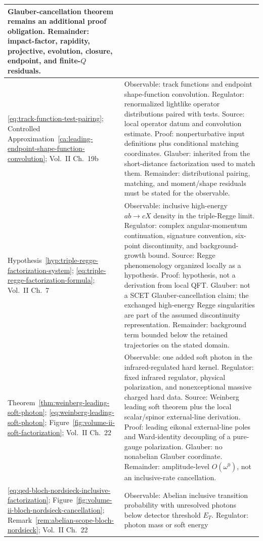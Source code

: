 {\begin{longtable}{@{}>{\raggedright\arraybackslash}p{}>{\raggedright\arraybackslash}p{}@{}}
Glauber-cancellation theorem remains an additional proof obligation.
Remainder: impact-factor, rapidity, projective, evolution, closure, endpoint,
and finite-\(Q\) residuals.
\\ \hline
\eqref{eq:track-function-test-pairing};
Controlled Approximation~\ref{ca:leading-endpoint-shape-function-convolution};
Vol.~II Ch.~19b &
Observable: track functions and endpoint shape-function convolution.
Regulator: renormalized lightlike operator distributions paired with tests.
Source: local operator datum and convolution estimate.  Proof:
nonperturbative input definitions plus conditional matching coordinates.
Glauber: inherited from the short-distance factorization used to match them.
Remainder: distributional pairing, matching, and moment/shape residuals must
be stated for the observable.
\\ \hline
Hypothesis~\ref{hyp:triple-regge-factorization-system};
\eqref{eq:triple-regge-factorization-formula};
Vol.~II Ch.~7 &
Observable: inclusive high-energy \(a b\to c X\) density in the triple-Regge
limit.  Regulator: complex angular-momentum continuation, signature convention,
six-point discontinuity, and background-growth bound.  Source: Regge
phenomenology organized locally as a hypothesis.  Proof: hypothesis, not a
derivation from local QFT.  Glauber: not a SCET Glauber-cancellation claim;
the exchanged high-energy Regge singularities are part of the assumed
discontinuity representation.  Remainder: background term bounded below the
retained trajectories on the stated domain.
\\ \hline
Theorem~\ref{thm:weinberg-leading-soft-photon};
\eqref{eq:weinberg-leading-soft-photon};
Figure~\ref{fig:volume-ii-soft-factorization};
Vol.~II Ch.~22 &
Observable: one added soft photon in the infrared-regulated hard kernel.
Regulator: fixed infrared regulator, physical polarization, and nonexceptional
massive charged hard data.  Source: Weinberg leading soft theorem plus the
local scalar/spinor external-line derivation.  Proof: leading eikonal
external-line poles and Ward-identity decoupling of a pure-gauge
polarization.  Glauber: no nonabelian Glauber coordinate.  Remainder:
amplitude-level \(O(\omega^0)\), not an inclusive-rate cancellation.
\\ \hline
\eqref{eq:qed-bloch-nordsieck-inclusive-factorization};
Figure~\ref{fig:volume-ii-bloch-nordsieck-cancellation};
Remark~\ref{rem:abelian-scope-bloch-nordsieck};
Vol.~II Ch.~22 &
Observable: Abelian inclusive transition probability with unresolved photons
below detector threshold \(E_T\).  Regulator: photon mass or soft energy

\end{longtable}}

